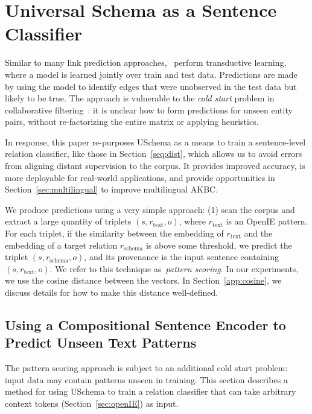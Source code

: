 \section{Universal Schema as a Sentence Classifier \label{sec:uschema}}
Similar to many link prediction approaches,~\citep{limin} perform transductive learning, where a model is learned jointly over train and test data. Predictions are made by using the model to identify edges that were unobserved in the test data but likely to be true. The approach is vulnerable to the \emph{cold start} problem in collaborative filtering~\citep{schein2002methods}: it is unclear how to form predictions for unseen entity pairs, without re-factorizing the entire matrix or applying heuristics. 

In response, this paper re-purposes USchema as a means to train a sentence-level relation classifier, like those in Section~\ref{seq:dist}, which allows us to avoid errors from aligning distant supervision to the corpus. It provides improved accuracy, is more deployable for real-world applications, and provide opportunities in Section~\ref{sec:multilingual} to improve multilingual AKBC.

We produce predictions using a very simple approach: (1) scan the corpus and extract a large quantity of triplets $(s,r_{\text{text}},o)$, where $r_{\text{text}}$ is an OpenIE pattern. For each triplet, if the similarity between the embedding of $r_{\text{text}}$ and the embedding of a target relation $r_{\text{schema}}$ is above some threshold, we predict the triplet $(s,r_{\text{schema}},o)$, and its provenance is the input sentence containing $(s,r_{\text{text}},o)$. We refer to this technique as~\textit{pattern scoring}. In our experiments, we use the cosine distance between the vectors. In Section~\ref{app:cosine}, we discuss details for how to make this distance well-defined. 


\subsection{Using a Compositional Sentence Encoder to Predict Unseen Text Patterns \label{sec:encoder}}
The pattern scoring approach is subject to an additional cold start problem: input data may contain patterns unseen in training. This section describes a method for using USchema to train a relation classifier that can take arbitrary context tokens (Section~\ref{sec:openIE}) as input.

